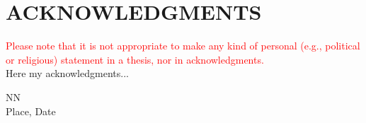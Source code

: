 \newpage
\section*{ACKNOWLEDGMENTS}
\textcolor{red}{Please note that it is not appropriate to make any kind of personal (e.g., political or religious) statement in a thesis, nor in acknowledgments.}\\

Here my acknowledgments...

\vspace{1cm}

NN\\
Place, Date
